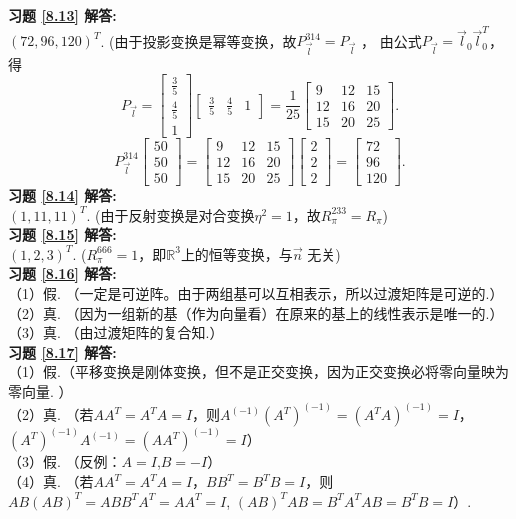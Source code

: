 \documentclass[a4paper]{book}
\begin{document}
\textbf{习题 \ref{8.13} 解答:}\\
$(72,96,120)^T$. (由于投影变换是幂等变换，故$P_{\vec{l}}^{314}=P_{\vec{l}}$ ，
由公式$P_{\vec{l}}=\vec{l}_0 \vec{l}_0^T$，得
\begin{equation*}
P_{\vec{l}}=\begin{bmatrix}\frac{3}{5}\\ \frac{4}{5}\\1\end{bmatrix}
\begin{bmatrix}\frac{3}{5}&\frac{4}{5}&1\end{bmatrix}=\frac{1}{25}\begin{bmatrix}9&12&15\\12&16&20\\15&20&25\end{bmatrix}.
\end{equation*}
\begin{equation*}
P_{\vec{l}}^{314}\begin{bmatrix}50\\50\\50\end{bmatrix}=
\begin{bmatrix}9&12&15\\12&16&20\\15&20&25\end{bmatrix}
\begin{bmatrix}2\\2\\2\end{bmatrix}=
\begin{bmatrix}72\\96\\120\end{bmatrix}.
\end{equation*}
\textbf{习题 \ref{8.14} 解答:}\\
$(1,11,11)^T$.  (由于反射变换是对合变换$\eta^2=1$，故$R_{\pi}^{233}=R_{\pi}$)\\
\textbf{习题 \ref{8.15} 解答:}\\
$(1,2,3)^T$.  ($R_{\pi}^{666}=1$，即$\mathbb{R}^3$上的恒等变换，与$\vec{n}$ 无关)\\
\textbf{习题 \ref{8.16} 解答:}\\
（1）假.  （一定是可逆阵。由于两组基可以互相表示，所以过渡矩阵是可逆的.）\\
（2）真. （因为一组新的基（作为向量看）在原来的基上的线性表示是唯一的.）\\
（3）真. （由过渡矩阵的复合知.）\\
\textbf{习题 \ref{8.17} 解答:}\\
（1）假.（平移变换是刚体变换，但不是正交变换，因为正交变换必将零向量映为零向量. ）\\
（2）真. （若$AA^T=A^TA=I$，则$A^(-1) (A^T )^(-1)=(A^T A)^(-1)=I$，$(A^T )^(-1) A^(-1)=(AA^T )^(-1)=I$）\\
（3）假. （反例：$A=I$,$B=-I$）\\
（4）真. （若$AA^T=A^T A=I$，$BB^T=B^T B=I$，则$AB(AB)^T=ABB^T A^T=AA^T=I$, $(AB)^T AB=B^T A^T AB=B^T B=I$）.

\end{document}
